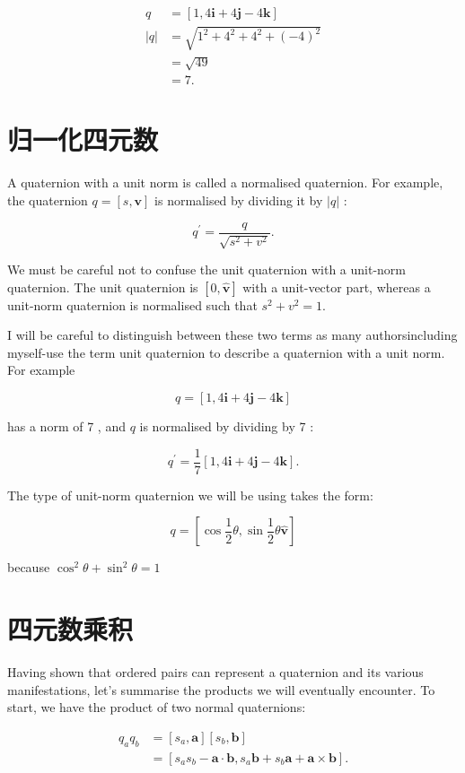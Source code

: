 $$
\begin{aligned}
q & =[1,4 \mathbf{i}+4 \mathbf{j}-4 \mathbf{k}] \\
|q| & =\sqrt{1^{2}+4^{2}+4^{2}+(-4)^{2}} \\
& =\sqrt{49} \\
& =7 .
\end{aligned}
$$

\section{归一化四元数}
A quaternion with a unit norm is called a normalised quaternion. For example, the quaternion $q=[s, \mathbf{v}]$ is normalised by dividing it by $|q|$ :

$$
q^{\prime}=\frac{q}{\sqrt{s^{2}+v^{2}}} .
$$

We must be careful not to confuse the unit quaternion with a unit-norm quaternion. The unit quaternion is $[0, \hat{\mathbf{v}}]$ with a unit-vector part, whereas a unit-norm quaternion is normalised such that $s^{2}+v^{2}=1$.

I will be careful to distinguish between these two terms as many authorsincluding myself-use the term unit quaternion to describe a quaternion with a unit norm. For example

$$
q=[1,4 \mathbf{i}+4 \mathbf{j}-4 \mathbf{k}]
$$

has a norm of 7 , and $q$ is normalised by dividing by 7 :

$$
q^{\prime}=\frac{1}{7}[1,4 \mathbf{i}+4 \mathbf{j}-4 \mathbf{k}] .
$$

The type of unit-norm quaternion we will be using takes the form:

$$
q=\left[\cos \frac{1}{2} \theta, \sin \frac{1}{2} \theta \hat{\mathbf{v}}\right]
$$

because $\cos ^{2} \theta+\sin ^{2} \theta=1$

\section{四元数乘积}
Having shown that ordered pairs can represent a quaternion and its various manifestations, let's summarise the products we will eventually encounter. To start, we have the product of two normal quaternions:

$$
\begin{aligned}
q_{a} q_{b} & =\left[s_{a}, \mathbf{a}\right]\left[s_{b}, \mathbf{b}\right] \\
& =\left[s_{a} s_{b}-\mathbf{a} \cdot \mathbf{b}, s_{a} \mathbf{b}+s_{b} \mathbf{a}+\mathbf{a} \times \mathbf{b}\right] .
\end{aligned}
$$

